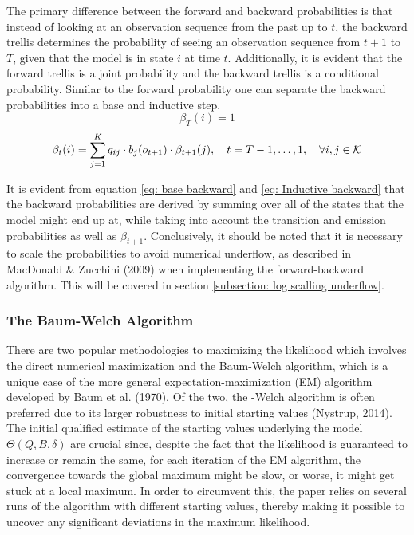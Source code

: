 The primary difference between the forward and backward probabilities is that instead of looking at an observation sequence from the past up to $t$, the backward trellis determines the probability of seeing an observation sequence from $t+1$ to $T$, given that the model is in state $i$ at time $t$. Additionally, it is evident that the forward trellis is a joint probability and the backward trellis is a conditional probability. Similar to the forward probability one can separate the backward probabilities into a base and inductive step. 
\begin{equation}
    \beta_T(i) = 1 %
    \label{eq: base backward}
\end{equation}
\begin{equation}
   \beta_t(i) = \sum_{j=1}^K q_{ij}\cdot b_j(o_{t+1})\cdot \beta_{t+1}(j),
   \quad t = T-1,\ldots,1,
   \quad \forall i,j \in\operatorname{\mathcal{K}}
    \label{eq: Inductive backward}
\end{equation}

It is evident from equation \ref{eq: base backward} and \ref{eq: Inductive backward} that the backward probabilities are derived by summing over all of the states that the model might end up at, while taking into account the transition and emission probabilities as well as $\beta_{t+1}$. Conclusively, it should be noted that it is necessary to scale the probabilities to avoid numerical underflow, as described in MacDonald \& Zucchini (2009) when implementing the forward-backward algorithm. This will be covered in section \ref{subsection: log scalling underflow}. 

\subsubsection{The Baum-Welch Algorithm}
There are two popular methodologies to maximizing the likelihood which involves the direct numerical maximization and the Baum-Welch algorithm, which is a unique case of the more general expectation-maximization (EM) algorithm developed by Baum et al. (1970). Of the two, the -Welch algorithm is often preferred due to its larger robustness to initial starting values (Nystrup, 2014). The initial qualified estimate of the starting values underlying the model $\Theta(Q,B,\delta)$ are crucial since, despite the fact that the likelihood is guaranteed to increase or remain the same, for each iteration of the EM algorithm, the convergence towards the global maximum might be slow, or worse, it might get stuck at a local maximum. In order to circumvent this, the paper relies on several runs of the algorithm with different starting values, thereby making it possible to uncover any significant deviations in the maximum likelihood. 


